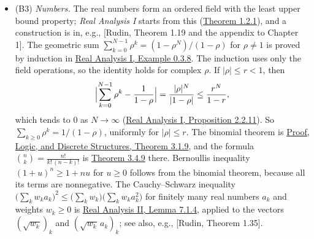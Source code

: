 \documentclass[
  english,
  11pt,
  a4paper,
]{article}
\begin{document}
\begin{itemize}
  \((-i)^kz=E(ix)\) for some \(k\in\{0,1,2,3\}\) and \(x\in[0,\pi/2]\).
  Then \(z=i^kE(ix)=E\bigl(i(x+k\pi/2)\bigr)\) by the law of exponents,
  and \(x+k\pi/2\in[0,2\pi]\). If \(x+k\pi/2=2\pi\), then
  \(z=E(2\pi i)=1=E(0)\). \emph{For real \(m\), the function
  \(t\mapsto E(imt)\) on \(\mathbb R\) is differentiable with derivative
  \(imE(imt)\).} For complex \(w\) with \(|w|\leq1\),
  \[|E(w)-1-w|\leq\sum_{k\geq2}\frac{|w|^k}{k!}\leq|w|^2\sum_{k\geq2}\frac1{k!}\leq|w|^2,\]
  by the triangle inequality for the partial sums, and since
  \(k!\geq2^{k-1}\) gives
  \(\sum_{k\geq2}1/k!\leq\sum_{k\geq2}2^{1-k}=1\). For real \(h\neq0\)
  with \(|mh|\leq1\), the law of exponents gives
  \(E(im(t+h))-E(imt)-imhE(imt)=E(imt)\bigl(E(imh)-1-imh\bigr)\), and
  \(|E(imt)|=1\). Hence
  \[\Bigl|\frac{E(im(t+h))-E(imt)}h-imE(imt)\Bigr|\leq\frac{|mh|^2}{|h|}=m^2|h|,\]
  which tends to \(0\) as \(h\to0\). See also, e.g., {[}Rudin,
  (8.25)--(8.28), (8.48) and Theorem 8.7{]}.
\item
  (B3) \emph{Numbers.} The real numbers form an ordered field with the
  least upper bound property; \emph{Real Analysis I} starts from this
  (\href{https://www.jirka.org/ra/html/sec_setofreals.html\#sec_setofreals-3-3}{Theorem
  1.2.1}), and a construction is in, e.g., {[}Rudin, Theorem 1.19 and
  the appendix to Chapter 1{]}. The geometric sum
  \(\sum_{k=0}^{N-1}\rho^k=(1-\rho^N)/(1-\rho)\) for \(\rho\neq1\) is
  proved by induction in
  \href{https://www.jirka.org/ra/html/sec_basicset.html\#example_geometricsum}{Real
  Analysis I, Example 0.3.8}. The induction uses only the field
  operations, so the identity holds for complex \(\rho\). If
  \(|\rho|\leq r<1\), then
  \[\Bigl|\sum_{k=0}^{N-1}\rho^k-\frac1{1-\rho}\Bigr|=\frac{|\rho|^N}{|1-\rho|}\leq\frac{r^N}{1-r},\]
  which tends to \(0\) as \(N\to\infty\)
  (\href{https://www.jirka.org/ra/html/sec_factslimsseqs.html\#sec_factslimsseqs-6-6}{Real
  Analysis I, Proposition 2.2.11}). So
  \(\sum_{k\geq0}\rho^k=1/(1-\rho)\), uniformly for \(|\rho|\leq r\).
  The binomial theorem is
  \href{https://kokunoyumeto.github.io/program-matematika-indonesia/en/courses/B10/reader/sec_counting-pascal.html\#thm-binomial}{Proof,
  Logic, and Discrete Structures, Theorem 3.1.9}, and the formula
  \(\binom nk=\frac{n!}{k!\,(n-k)!}\) is
  \href{https://kokunoyumeto.github.io/program-matematika-indonesia/en/courses/B10/reader/sec_counting-combperm.html\#subsec-combinations-9}{Theorem
  3.4.9} there. Bernoulli\textquotesingle s inequality
  \((1+u)^n\geq1+nu\) for \(u\geq0\) follows from the binomial theorem,
  because all its terms are nonnegative. The Cauchy--Schwarz inequality
  \(\bigl(\sum_kw_ka_k\bigr)^2\leq\bigl(\sum_kw_k\bigr)\bigl(\sum_kw_ka_k^2\bigr)\)
  for finitely many real numbers \(a_k\) and weights \(w_k\geq0\) is
  \href{https://www.jirka.org/ra/html/sec_metric.html\#sec_metric-16}{Real
  Analysis II, Lemma 7.1.4}, applied to the vectors \((\sqrt{w_k})_k\)
  and \((\sqrt{w_k}\,a_k)_k\); see also, e.g., {[}Rudin, Theorem
  1.35{]}.
\end{itemize}
\end{document}
